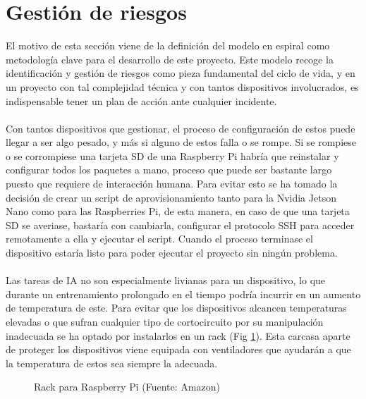 \section{Gestión de riesgos}\label{GestionRiesgos}
El motivo de esta sección viene de la definición del modelo en espiral como metodología clave para el desarrollo de este proyecto. Este modelo recoge la identificación y gestión de riesgos como pieza fundamental del ciclo de vida, y en un proyecto con tal complejidad técnica y con tantos dispositivos involucrados, es indispensable tener un plan de acción ante cualquier incidente.
\\ \\
Con tantos dispositivos que gestionar, el proceso de configuración de estos puede llegar a ser algo pesado, y más si alguno de estos falla o se rompe. Si se rompiese o se corrompiese una tarjeta SD de una Raspberry Pi habría que reinstalar y configurar todos los paquetes a mano, proceso que puede ser bastante largo puesto que requiere de interacción humana. Para evitar esto se ha tomado la decisión de crear un script de aprovisionamiento tanto para la Nvidia Jetson Nano como para las Raspberries Pi, de esta manera, en caso de que una tarjeta SD se averiase, bastaría con cambiarla, configurar el protocolo SSH para acceder remotamente a ella y ejecutar el script. Cuando el proceso terminase el dispositivo estaría listo para poder ejecutar el proyecto sin ningún problema.
\\ \\
Las tareas de IA no son especialmente livianas para un dispositivo, lo que durante un entrenamiento prolongado en el tiempo podría incurrir en un aumento de temperatura de este. Para evitar que los dispositivos alcancen temperaturas elevadas o que sufran cualquier tipo de cortocircuito por su manipulación inadecuada se ha optado por instalarlos en un rack (Fig \ref{fig:RackRaspberry}). Esta carcasa aparte de proteger los dispositivos viene equipada con ventiladores que ayudarán a que la temperatura de estos sea siempre la adecuada.

\begin{figure}[thbp]
    \centering
    \caption{Rack para Raspberry Pi (Fuente: Amazon\autocite{ParaRaspberryPi})}
    \label{fig:RackRaspberry}
\end{figure}

